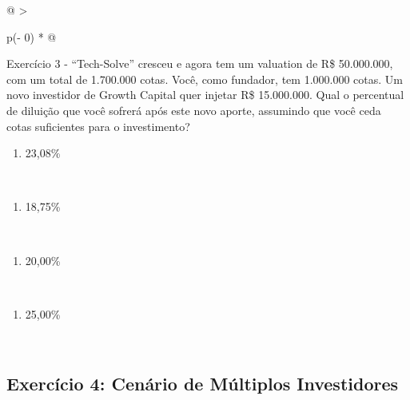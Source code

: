 \documentclass[
]{book}
\providecommand{\tightlist}{%
  \setlength{\itemsep}{0pt}\setlength{\parskip}{0pt}}
\begin{document}
\begin{longtable}[]{@{}
  >{\raggedright\arraybackslash}p{(\columnwidth - 0\tabcolsep) * }@{}}
\toprule\noalign{}
\endhead
\bottomrule\noalign{}
\endlastfoot
Exercício 3 - ``Tech-Solve'' cresceu e agora tem um valuation de R\$ 50.000.000, com um total de 1.700.000 cotas. Você, como fundador, tem 1.000.000 cotas. Um novo investidor de Growth Capital quer injetar R\$ 15.000.000. Qual o percentual de diluição que você sofrerá após este novo aporte, assumindo que você ceda cotas suficientes para o investimento? \\
\begin{minipage}[t]{\linewidth}\raggedright
\begin{enumerate}
\def\labelenumi{\alph{enumi})}
\tightlist
\item
  23,08\%
\end{enumerate}
\end{minipage} \\
\begin{minipage}[t]{\linewidth}\raggedright
\begin{enumerate}
\def\labelenumi{\alph{enumi})}
\setcounter{enumi}{1}
\tightlist
\item
  18,75\%
\end{enumerate}
\end{minipage} \\
\begin{minipage}[t]{\linewidth}\raggedright
\begin{enumerate}
\def\labelenumi{\alph{enumi})}
\setcounter{enumi}{2}
\tightlist
\item
  20,00\%
\end{enumerate}
\end{minipage} \\
\begin{minipage}[t]{\linewidth}\raggedright
\begin{enumerate}
\def\labelenumi{\alph{enumi})}
\setcounter{enumi}{3}
\tightlist
\item
  25,00\%
\end{enumerate}
\end{minipage} \\
\end{longtable}

\subsection{Exercício 4: Cenário de Múltiplos Investidores}\label{exercuxedcio-4-cenuxe1rio-de-muxfaltiplos-investidores}
\end{document}
